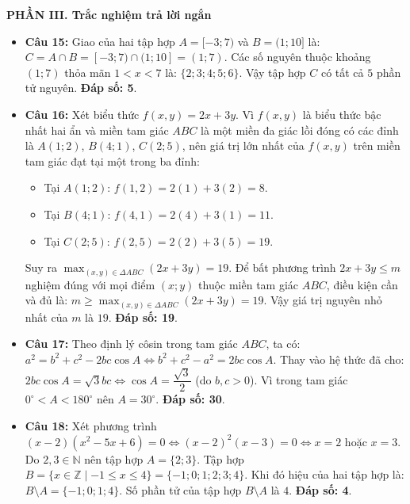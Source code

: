 \documentclass[12pt,a4paper]{article}
\begin{document}
\vspace{0.2cm}
\textbf{PHẦN III. Trắc nghiệm trả lời ngắn}
\begin{itemize}[leftmargin=0.6cm, itemsep=4pt]
    \item \textbf{Câu 15:} Giao của hai tập hợp $A = [-3; 7)$ và $B = (1; 10]$ là:
    $C = A \cap B = [-3; 7) \cap (1; 10] = (1; 7)$.
    Các số nguyên thuộc khoảng $(1; 7)$ thỏa mãn $1 < x < 7$ là: $\{2; 3; 4; 5; 6\}$.
    Vậy tập hợp $C$ có tất cả $5$ phần tử nguyên. \textbf{Đáp số: 5}.
    \item \textbf{Câu 16:} Xét biểu thức $f(x, y) = 2x + 3y$.
    Vì $f(x, y)$ là biểu thức bậc nhất hai ẩn và miền tam giác $ABC$ là một miền đa giác lồi đóng có các đỉnh là $A(1; 2)$, $B(4; 1)$, $C(2; 5)$, nên giá trị lớn nhất của $f(x, y)$ trên miền tam giác đạt tại một trong ba đỉnh:
    \begin{itemize}
        \item Tại $A(1; 2)$: $f(1, 2) = 2(1) + 3(2) = 8$.
        \item Tại $B(4; 1)$: $f(4, 1) = 2(4) + 3(1) = 11$.
        \item Tại $C(2; 5)$: $f(2, 5) = 2(2) + 3(5) = 19$.
    \end{itemize}
    Suy ra $\max_{(x, y) \in \Delta ABC} (2x + 3y) = 19$.
    Để bất phương trình $2x + 3y \le m$ nghiệm đúng với mọi điểm $(x; y)$ thuộc miền tam giác $ABC$, điều kiện cần và đủ là:
    $m \ge \max_{(x, y) \in \Delta ABC} (2x + 3y) = 19$.
    Vậy giá trị nguyên nhỏ nhất của $m$ là $19$. \textbf{Đáp số: 19}.
    \item \textbf{Câu 17:} Theo định lý côsin trong tam giác $ABC$, ta có:
    $a^2 = b^2 + c^2 - 2bc \cos A \iff b^2 + c^2 - a^2 = 2bc \cos A$.
    Thay vào hệ thức đã cho:
    $2bc \cos A = \sqrt{3}bc \iff \cos A = \dfrac{\sqrt{3}}{2}$ (do $b, c > 0$).
    Vì trong tam giác $0^\circ < A < 180^\circ$ nên $A = 30^\circ$. \textbf{Đáp số: 30}.
    \item \textbf{Câu 18:} Xét phương trình $(x - 2)(x^2 - 5x + 6) = 0 \iff (x - 2)^2(x - 3) = 0 \iff x = 2$ hoặc $x = 3$.
    Do $2, 3 \in \mathbb{N}$ nên tập hợp $A = \{2; 3\}$.
    Tập hợp $B = \{x \in \mathbb{Z} \mid -1 \le x \le 4\} = \{-1; 0; 1; 2; 3; 4\}$.
    Khi đó hiệu của hai tập hợp là:
    $B \setminus A = \{-1; 0; 1; 4\}$.
    Số phần tử của tập hợp $B \setminus A$ là $4$. \textbf{Đáp số: 4}.
\end{itemize}
\end{document}
